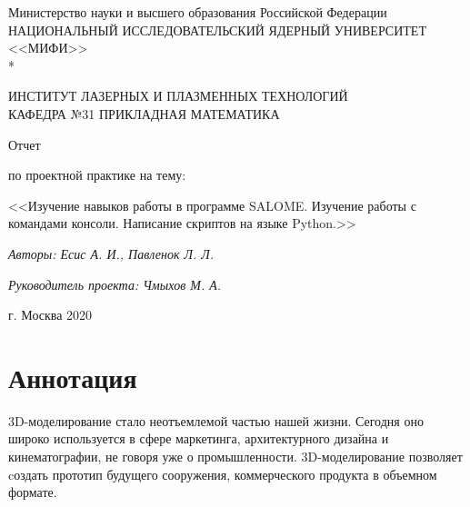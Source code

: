 \documentclass[a4paper,12pt]{article}
\theoremstyle{plain} %
\theoremstyle{definition} %
\theoremstyle{remark} %
\begin{document}
		\renewcommand{\contentsname}{\Large Содержание}
		\renewcommand{\bibname}{\normalfont\Large\bfseries Список литературы}
		
		\begin{titlepage}
			\begin{center}
				Министерство науки и высшего образования Российской Федерации \\
				НАЦИОНАЛЬНЫЙ ИССЛЕДОВАТЕЛЬСКИЙ ЯДЕРНЫЙ УНИВЕРСИТЕТ <<МИФИ>> \\*
				\hrulefill
			\end{center}
		
		\begin{center}
			ИНСТИТУТ ЛАЗЕРНЫХ И ПЛАЗМЕННЫХ ТЕХНОЛОГИЙ\\
			КАФЕДРА №31 ПРИКЛАДНАЯ МАТЕМАТИКА
		\end{center}
		\vspace{1cm}
		
		\vspace{2em}
		
		\begin{center}
			\large{Отчет}
			
			по проектной практике на тему:
		\end{center}
		\begin{center}
			\large <<Изучение навыков работы в программе SALOME. Изучение работы с командами консоли. Написание скриптов на языке Python.>>
		\end{center}
		\begin{center}
		\large \textit{Авторы: Есис А. И., Павленок Л. Л.}
		
		\textit{Руководитель проекта: Чмыхов М. А.}
		\end{center}


	
	

\vspace{26em}
		
		\begin{center}
			г. Москва 2020
		\end{center}
	\end{titlepage}

	\newpage 
	\tableofcontents
	\setcounter{page}{3}
	
	\newpage
	\section*{Аннотация}
	
	3D-моделирование стало неотъемлемой частью нашей жизни. Сегодня оно широко используется в сфере маркетинга, архитектурного дизайна и кинематографии, не говоря уже о промышленности. 3D-моделирование позволяет cоздать прототип будущего сооружения, коммерческого продукта в объемном формате.
	
\end{document}
